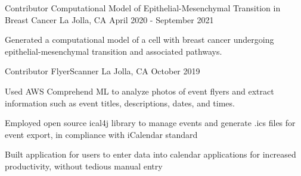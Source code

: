 \begin{cventries}

\cventry
{Contributor} %
{Computational Model of Epithelial-Mesenchymal Transition in Breast Cancer} %
{La Jolla, CA} %
{April 2020 - September 2021} %
{
    \begin{cvitems} %
        \item {Generated a computational model of a cell with breast cancer undergoing epithelial-mesenchymal transition and associated pathways.}
    \end{cvitems}
}
  \cventry
    {Contributor} %
    {FlyerScanner} %
    {La Jolla, CA} %
    {October 2019} %
    {
      \begin{cvitems} %
        \item {Used AWS Comprehend ML to analyze photos of event flyers and extract information such as event titles, descriptions, dates, and times.}
        \item {Employed open source ical4j library to manage events and generate .ics files for event export, in compliance with iCalendar standard}
        \item {Built application for users to enter data into calendar applications for increased productivity, without tedious manual entry}
      \end{cvitems}
    }
\end{cventries}